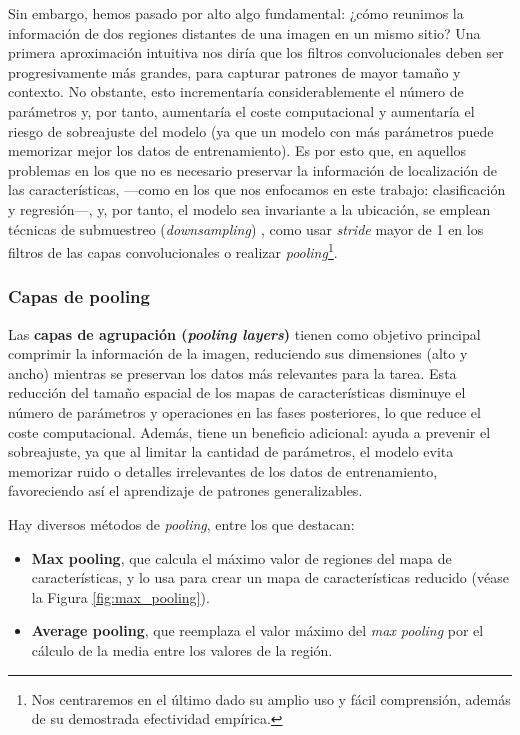 Sin embargo, hemos pasado por alto algo fundamental: ¿cómo reunimos la información de dos regiones distantes 
de una imagen en un mismo sitio? Una primera aproximación intuitiva nos diría que los filtros convolucionales 
deben ser progresivamente más grandes, para capturar patrones de mayor tamaño y contexto. No obstante, esto
incrementaría considerablemente el número de parámetros y, por tanto, aumentaría el coste computacional y 
aumentaría el riesgo de sobreajuste del modelo (ya que un modelo con más parámetros puede memorizar mejor los
datos de entrenamiento). Es por esto que, en aquellos problemas en los que no es necesario preservar la 
información de localización de las características, ---como en los que nos enfocamos en este trabajo: 
clasificación y regresión---, y, por tanto, el modelo sea invariante a la ubicación, se emplean técnicas de 
submuestreo (\textit{downsampling}) \cite{murphy2022}, como usar \textit{stride} mayor de 1 en los filtros
de las capas convolucionales o realizar \textit{pooling}\footnote{
    Nos centraremos en el último dado su amplio uso y fácil comprensión, además de su demostrada efectividad 
    empírica.
}.



\subsubsection{Capas de pooling}

Las \textbf{capas de agrupación (\textit{pooling layers})} tienen como objetivo principal comprimir la 
información de la imagen, reduciendo sus dimensiones (alto y ancho) mientras se preservan los datos más 
relevantes para la tarea. Esta reducción del tamaño espacial de los mapas de características disminuye el 
número de parámetros y operaciones en las fases posteriores, lo que reduce el coste computacional. Además, 
tiene un beneficio adicional: ayuda a prevenir el sobreajuste, ya que al limitar la cantidad de parámetros, 
el modelo evita memorizar ruido o detalles irrelevantes de los datos de entrenamiento, favoreciendo así el 
aprendizaje de patrones generalizables.

Hay diversos métodos de \textit{pooling}, entre los que destacan:

\begin{itemize}

    \item \textbf{Max pooling}, que calcula el máximo valor de regiones del mapa de características, y lo
    usa para crear un mapa de características reducido (véase la Figura \ref{fig:max_pooling}).

    \item \textbf{Average pooling}, que reemplaza el valor máximo del \textit{max pooling} por el cálculo de
    la media entre los valores de la región. 

\end{itemize}

